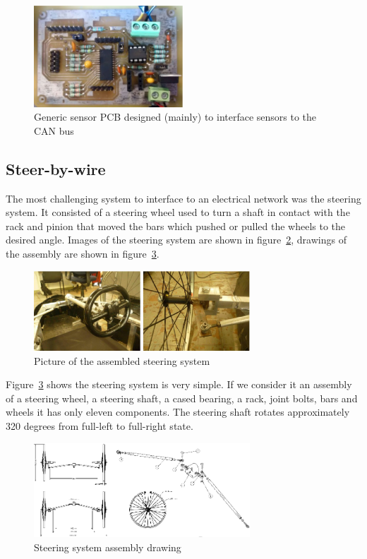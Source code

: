 \documentclass[twocolumn,10pt]{asme2e}
\begin{document}
\begin{figure}
\begin{center}
\includegraphics[height=3.8cm]{figs/fig_pcb.eps}
\caption{Generic sensor PCB designed (mainly) to interface sensors to the CAN bus}
\label{figs/fig_pcb}
\end{center}
\end{figure}

\subsection*{Steer-by-wire}
The most challenging system to interface to an electrical network was
the steering system. It consisted of a steering wheel used to turn a
shaft in contact with the rack and pinion that moved the bars which
pushed or pulled the wheels to the desired angle. Images of the steering
system are shown in figure~\ref{figs/fig_steer_photo}, drawings of
the assembly are shown in figure~\ref{figs/fig_steer}.

\begin{figure}
\begin{center}
\includegraphics[width=8.1cm]{figs/fig_steer_photo.eps}
\caption{Picture of the assembled steering system}
\label{figs/fig_steer_photo}
\end{center}
\end{figure}

Figure~\ref{figs/fig_steer} shows the steering system is very simple.
If we consider it an assembly of a steering wheel, a steering shaft,
a cased bearing, a rack, joint bolts, bars and wheels it has only
eleven components. The steering shaft rotates approximately 320 degrees
from full-left to full-right state.

\begin{figure}
\begin{center}
\includegraphics[width=8.1cm]{figs/fig_steer.eps}
\caption{Steering system assembly drawing}
\label{figs/fig_steer}
\end{center}
\end{figure}
\end{document}
